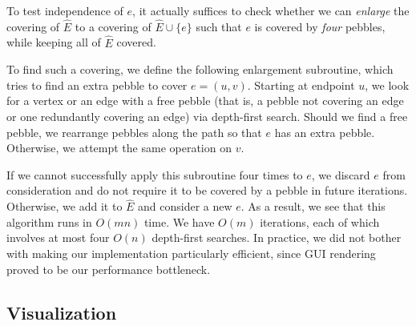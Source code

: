 \documentclass[aps,prd,final,twocolumn,letterpaper,nofootinbib]{revtex4-1}
\begin{document}
To test independence of $e$,
it actually suffices to check whether we can \emph{enlarge} the covering of $\hat E$
to a covering of $\hat E \cup \{e\}$
such that $e$ is covered by \emph{four} pebbles,
while keeping all of $\hat E$ covered.

To find such a covering,
we define the following enlargement subroutine,
which tries to find an extra pebble to cover $e = (u, v)$.
Starting at endpoint $u$,
we look for a vertex or an edge with a free pebble
(that is, a pebble not covering an edge
or one redundantly covering an edge)
via depth-first search.
Should we find a free pebble,
we rearrange pebbles along the path so that $e$ has an extra pebble.
Otherwise, we attempt the same operation on $v$.

If we cannot successfully apply this subroutine four times to $e$,
we discard $e$ from consideration
and do not require it to be covered by a pebble in future iterations.
Otherwise, we add it to $\hat E$ and consider a new $e$.
As a result,
we see that this algorithm runs in $O(mn)$ time.
We have $O(m)$ iterations,
each of which involves at most four $O(n)$ depth-first searches.
In practice, we did not bother with making our implementation particularly efficient,
since GUI rendering proved to be our performance bottleneck.


\subsection{Visualization}
\end{document}
